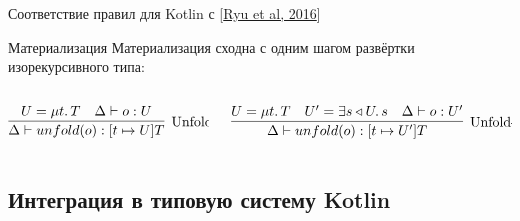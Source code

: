 \documentclass[aspectratio=169,usenames,dvipsnames]{beamer}
\begin{document}
\begin{frame}{Соответствие правил для Kotlin с [\href{https://dl.acm.org/doi/pdf/10.1145/2888392}{Ryu et al, 2016}]}
        \begin{block}{Материализация}
            Материализация сходна с одним шагом развёртки изорекурсивного типа:
            \vspace{-1em}
            \begin{columns}[onlytextwidth]
                \begin{column}[t]{0.41\textwidth}
                    \[
                        \infer[\text{Unfold-Self}]{
                            \Delta \vdash unfold(o) : [t \mapsto U]T
                        }{
                            U = \mu t \ldotp T & \Delta \vdash o : U
                        }
                    \]
                \end{column}\hfill%
                \begin{column}[t]{0.58\textwidth}
                    \[
                        \infer[\text{Unfold-NoSelf}]{
                            \Delta \vdash unfold(o) : [t \mapsto U']T
                        }{
                            U = \mu t \ldotp T
                            &
                            U' = \exists s \triangleleft U \ldotp s
                            &
                            \Delta \vdash o : U'
                        }
                    \]
                \end{column}
            \end{columns}
        \end{block}
    \end{frame}


    \subsection{Интеграция в типовую систему Kotlin}
\end{document}
